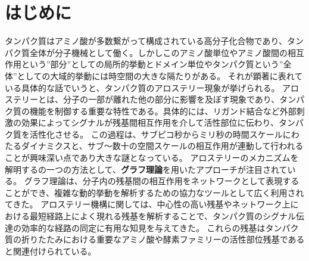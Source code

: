 \section{はじめに}

タンパク質はアミノ酸が多数繋がって構成されている高分子化合物であり、タンパク質全体が分子機械として働く。しかしこのアミノ酸単位やアミノ酸間の相互作用という”部分”としての局所的挙動とドメイン単位やタンパク質という”全体”としての大域的挙動には時空間の大きな隔たりがある。
それが顕著に表れている具体的な話でいうと、タンパク質のアロステリー現象が挙げられる。
アロステリーとは、分子の一部が離れた他の部分に影響を及ぼす現象であり、タンパク質の機能を制御する重要な特性である。具体的には、リガンド結合など外部刺激の効果によってシグナルが残基間相互作用を介して活性部位に伝わり、タンパク質を活性化させる。
この過程は、サブピコ秒からミリ秒の時間スケールにわたるダイナミクスと、サブ\text{\AA}～数十\text{\AA}の空間スケールの相互作用が連動して行われることが興味深い点であり大きな謎となっている。
アロステリーのメカニズムを解明するの一つの方法として、\textbf{グラフ理論}を用いたアプローチが注目されている。
グラフ理論は、分子内の残基間の相互作用をネットワークとして表現することができ、複雑な動的挙動を解析するための協力なツールとして広く利用されてきた。
アロステリー機構に関しては、中心性の高い残基やネットワーク上における最短経路上によく現れる残基を解析することで、タンパク質のシグナル伝達の効率的な経路の同定に有用な知見を与えてきた。
これらの残基はタンパク質の折りたたみにおける重要なアミノ酸や酵素ファミリーの活性部位残基であると関連付けられている。

